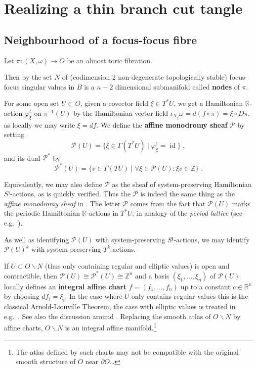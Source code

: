 \documentclass[12pt,a4paper,abstract=true,draft]{scrartcl}
\DeclareMathOperator{\id}{id}
\begin{document}
\section{Realizing a thin branch cut tangle}

\subsection{Neighbourhood of a focus-focus fibre}

Let $π \colon (X,ω) → O$ be an almost toric fibration.

Then by \cite[Proposition~5.4]{Zun96} the set $N$ of (codimension 2 non-degenerate topologically stable) focus-focus singular values in $B$ is a $n-2$ dimensional submanifold called \textbf{nodes} of $π$.

For some open set $U ⊂ O$, given a covector field $ξ ∈ T^*U$, we get a Hamiltonian $ℝ$-action $φ_ξ^t$ on $π^{-1}(U)$ by the Hamiltonian vector field $ι_{X_ξ} ω = d(f ∘ π) = ξ ∘ Dπ$, as locally we may write $ξ=df$.
We define the \textbf{affine monodromy sheaf} $𝒫$ by setting
\[𝒫(U) = \{ξ ∈ Γ(T^*U) \mid φ_ξ^1 = \id \} \; ,\]
and its dual $𝒫^*$ by
\[𝒫^*(U) = \{ v ∈ Γ(TU) \mid ∀ ξ ∈ 𝒫(U)\colon ξv ∈ ℤ  \} \; .\]

\begin{remark}
  Equivalently, we may also define $𝒫$ as the sheaf of system-preserving Hamiltonian $S¹$-actions, as is quickly verified.
  Thus the $𝒫$ is indeed the same thing as the \emph{affine monodromy sheaf} in \cite{Zun03}.
  The letter $𝒫$ comes from the fact that $𝒫(U)$ marks the periodic Hamiltonian $ℝ$-actions in $T^*U$, in analogy of the \emph{period lattice} (see e.g.\ \cite[Section 1.4]{Eva19}).

  As well as identifying $𝒫(U)$ with system-preserving $S¹$-actions, we may identify $𝒫(U)^k$ with system-preserving $T^k$-actions.
\end{remark}

If $U ⊂ O ∖ N$ (thus only containing regular and elliptic values) is open and contractible, then $𝒫(U) ≅ 𝒫^*(U) ≅ ℤ^n$ and a basis $(ξ_1,…,ξ_n)$ of $𝒫(U)$ locally defines an \textbf{integral affine chart} $f=(f_1,…,f_n)$ up to a constant $c ∈ ℝ^n$ by choosing $df_i = ξ_i$.
In the case where $U$ only contains regular values this is the classical Arnold-Liouville Theorem, the case with elliptic values is treated in e.g.\ \cite{DuMo91}.
See also the discussion around \cite[Theorem 3.9]{Zun96}.
Replacing the smooth atlas of $O ∖ N$ by affine charts, $O ∖ N$ is an integral affine manifold.\footnote{The atlas defined by such charts may not be compatible with the original smooth structure of $O$ near $∂O$…}
\end{document}
